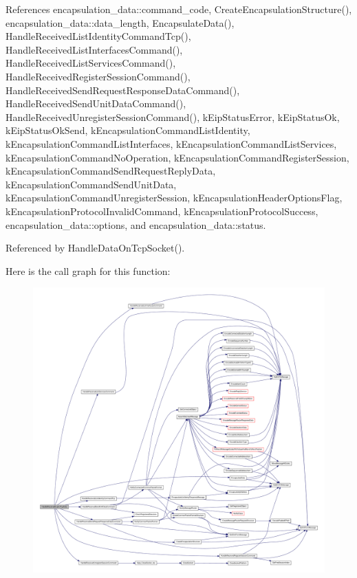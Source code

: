 \-References encapsulation\-\_\-data\-::command\-\_\-code, \-Create\-Encapsulation\-Structure(), encapsulation\-\_\-data\-::data\-\_\-length, \-Encapsulate\-Data(), \-Handle\-Received\-List\-Identity\-Command\-Tcp(), \-Handle\-Received\-List\-Interfaces\-Command(), \-Handle\-Received\-List\-Services\-Command(), \-Handle\-Received\-Register\-Session\-Command(), \-Handle\-Received\-Send\-Request\-Response\-Data\-Command(), \-Handle\-Received\-Send\-Unit\-Data\-Command(), \-Handle\-Received\-Unregister\-Session\-Command(), k\-Eip\-Status\-Error, k\-Eip\-Status\-Ok, k\-Eip\-Status\-Ok\-Send, k\-Encapsulation\-Command\-List\-Identity, k\-Encapsulation\-Command\-List\-Interfaces, k\-Encapsulation\-Command\-List\-Services, k\-Encapsulation\-Command\-No\-Operation, k\-Encapsulation\-Command\-Register\-Session, k\-Encapsulation\-Command\-Send\-Request\-Reply\-Data, k\-Encapsulation\-Command\-Send\-Unit\-Data, k\-Encapsulation\-Command\-Unregister\-Session, k\-Encapsulation\-Header\-Options\-Flag, k\-Encapsulation\-Protocol\-Invalid\-Command, k\-Encapsulation\-Protocol\-Success, encapsulation\-\_\-data\-::options, and encapsulation\-\_\-data\-::status.



\-Referenced by \-Handle\-Data\-On\-Tcp\-Socket().



\-Here is the call graph for this function\-:
\nopagebreak
\begin{figure}[H]
\begin{center}
\leavevmode
\includegraphics[width=350pt]{d2/dc9/group__CIP__API_gacbbc9669d41357e1c8497c34ee8eeffb_cgraph}
\end{center}
\end{figure}




